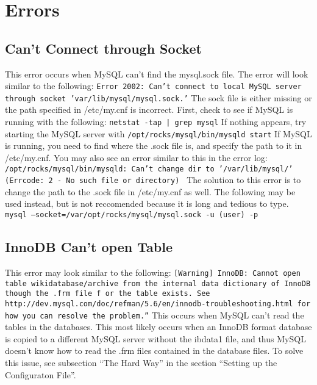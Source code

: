\documentclass[12pt]{article}
\begin{document}
\section{Errors}

\subsection{Can't Connect through Socket}
This error occurs when MySQL can't find the mysql.sock file. The error will look similar to the following: 
{\tt Error 2002: Can't connect to local MySQL server through socket 'var/lib/mysql/mysql.sock.'}
The sock file is either missing or the path specified in /etc/my.cnf is incorrect. First, check to see if MySQL is running with the following: 
{\tt netstat -tap | grep mysql}
If nothing appears, try starting the MySQL server with {\tt /opt/rocks/mysql/bin/mysqld start}
If MySQL is running, you need to find where the .sock file is, and specify the path to it in /etc/my.cnf. You may also see an error similar to this in the error log:
{\tt /opt/rocks/mysql/bin/mysqld: Can't change dir to '/var/lib/mysql/' (Errcode: 2 - No such file or directory) }
The solution to this error is to change the path to the .sock file in /etc/my.cnf as well.
The following may be used instead, but is not reccomended because it is long and tedious to type.
{\tt mysql --socket=/var/opt/rocks/mysql/mysql.sock  -u (user) -p}

\subsection{InnoDB Can't open Table}
This error may look similar to the following: 
{\tt [Warning] InnoDB: Cannot open table wikidatabase/archive from the internal data dictionary of InnoDB though the .frm file f\
or the table exists. See http://dev.mysql.com/doc/refman/5.6/en/innodb-troubleshooting.html for how you can resolve the problem.''} 
This occurs when MySQL can't read the tables in the databases. This most likely occurs when an InnoDB format database is copied to a different MySQL server without the ibdata1 file, and thus MySQL doesn't know how to read the .frm files contained in the database files. To solve this issue, see subsection ``The Hard Way'' in the section ``Setting up the Configuraton File''. 
\end{document}

